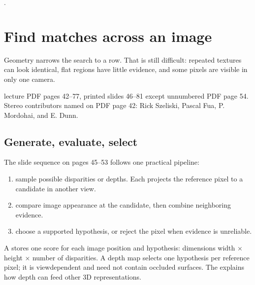 \documentclass[letterpaper,11pt,english,openany,oneside]{jupyterBook}
\begin{document}
\sphinxAtStartPar
{} {\hyperref[\detokenize{lectures/lecture04/quiz-workbook:quiz-4-q2}]{}}.

\sphinxstepscope


\section{Find matches across an image}
\label{\detokenize{lectures/lecture04/matching:find-matches-across-an-image}}\label{\detokenize{lectures/lecture04/matching:lec04-matching}}\label{\detokenize{lectures/lecture04/matching::doc}}
\sphinxAtStartPar
Geometry narrows the search to a row.  That is still difficult: repeated textures can look identical, flat regions have little evidence, and some pixels are visible in only one camera.

\sphinxAtStartPar
{} lecture PDF pages 42–77, printed slides 46–81 except unnumbered PDF page 54. Stereo contributors named on PDF page 42: Rick Szeliski, Pascal Fua, P. Mordohai, and E. Dunn.


\subsection{Generate, evaluate, select}
\label{\detokenize{lectures/lecture04/matching:generate-evaluate-select}}
\sphinxAtStartPar
The slide sequence on pages 45–53 follows one practical pipeline:
\begin{enumerate}
%
\item {}
\sphinxAtStartPar
{} sample possible disparities or depths. Each projects the reference pixel to a candidate in another view.

\item {}
\sphinxAtStartPar
{} compare image appearance at the candidate, then combine neighboring evidence.

\item {}
\sphinxAtStartPar
{} choose a supported hypothesis, or reject the pixel when evidence is unreliable.

\end{enumerate}

\sphinxAtStartPar
A  stores one score for each image position and hypothesis: dimensions width × height × number of disparities. A depth map selects one hypothesis per reference pixel; it is view\sphinxhyphen{}dependent and need not contain occluded surfaces. The {\hyperref[\detokenize{lectures/lecture01/motivation::doc}]{}} explains how depth can feed other 3D representations.
\end{document}
